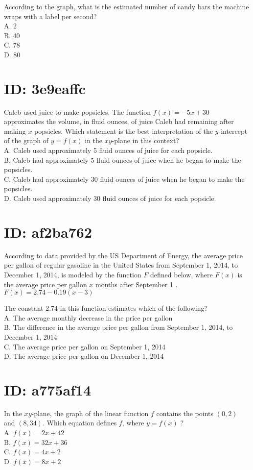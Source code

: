 According to the graph, what is the estimated number of candy bars the machine wraps with a label per second?\\
A. 2\\
B. 40\\
C. 78\\
D. 80

\section*{ID: 3e9eaffc}
Caleb used juice to make popsicles. The function $f(x)=-5 x+30$ approximates the volume, in fluid ounces, of juice Caleb had remaining after making $x$ popsicles. Which statement is the best interpretation of the $y$-intercept of the graph of $y=f(x)$ in the $x y$-plane in this context?\\
A. Caleb used approximately 5 fluid ounces of juice for each popsicle.\\
B. Caleb had approximately 5 fluid ounces of juice when he began to make the popsicles.\\
C. Caleb had approximately 30 fluid ounces of juice when he began to make the popsicles.\\
D. Caleb used approximately 30 fluid ounces of juice for each popsicle.

\section*{ID: af2ba762}
According to data provided by the US Department of Energy, the average price per gallon of regular gasoline in the United States from September 1, 2014, to December 1, 2014, is modeled by the function $F$ defined below, where $F(x)$ is the average price per gallon $x$ months after September 1 .\\
$F(x)=2.74-0.19(x-3)$

The constant 2.74 in this function estimates which of the following?\\
A. The average monthly decrease in the price per gallon\\
B. The difference in the average price per gallon from September 1, 2014, to December 1, 2014\\
C. The average price per gallon on September 1, 2014\\
D. The average price per gallon on December 1, 2014

\section*{ID: a775af14}
In the $x y$-plane, the graph of the linear function $f$ contains the points $(0,2)$ and $(8,34)$. Which equation defines $f$, where $y=f(x)$ ?\\
A. $f(x)=2 x+42$\\
B. $f(x)=32 x+36$\\
C. $f(x)=4 x+2$\\
D. $f(x)=8 x+2$

